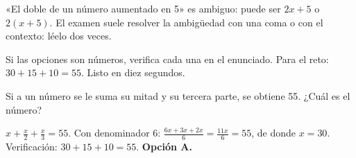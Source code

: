 \begin{trampa}
«El doble de un número aumentado en 5» es ambiguo: puede ser $2x + 5$ o $2(x + 5)$. El examen suele resolver la
ambigüedad con una coma o con el contexto: léelo dos veces.
\end{trampa}

\begin{atajo}
Si las opciones son números, verifica cada una en el enunciado. Para el reto: $30 + 15 + 10 = 55$. Listo en diez
segundos.
\end{atajo}

\begin{reto}
Si a un número se le suma su mitad y su tercera parte, se obtiene 55. ¿Cuál es el número?
\end{reto}

\begin{retoresuelto}
$x + \tfrac{x}{2} + \tfrac{x}{3} = 55$. Con denominador 6: $\tfrac{6x + 3x + 2x}{6} = \tfrac{11x}{6} = 55$, de donde
$x = 30$. Verificación: $30 + 15 + 10 = 55$. \textbf{Opción A.}
\end{retoresuelto}


